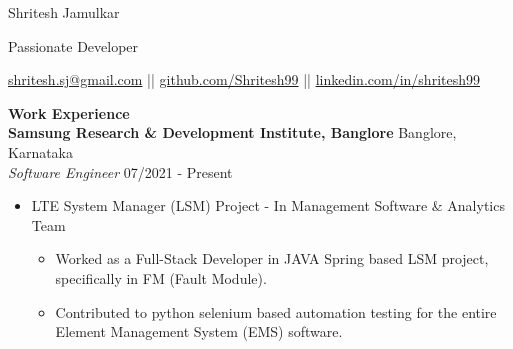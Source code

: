 \documentclass{article}
\begin{document}
\begin{center}

\LARGE Shritesh Jamulkar \\

\vspace{3pt}

\large \textcolor{NavyBlue}{Passionate Developer} \\

\vspace{5pt}

\normalsize \href{mailto:shritesh.sj@gmail@gmail.com}{shritesh.sj@gmail.com} || \href{https://github.com/Shritesh99}{github.com/Shritesh99} || \href{https://linkedin.com/in/shritesh99}{linkedin.com/in/shritesh99} \\
\end{center}

\noindent \large \textbf{\textcolor{NavyBlue}{Work Experience}} \vspace{5pt} \\
\noindent \normalsize \textbf{Samsung Research \& Development Institute, Banglore} \hfill Banglore, Karnataka \\
\textit{Software Engineer} \hfill 07/2021 - Present
\begin{itemize}[noitemsep,nolistsep,leftmargin=*]
    \item {\normalsize {LTE System Manager (LSM) Project - In Management Software \& Analytics Team }
        \begin{itemize}
            \item  Worked as a Full-Stack Developer in JAVA Spring based LSM project, specifically in FM (Fault Module).
            \item Contributed to python selenium based automation testing for the entire Element Management System (EMS) software.
        \end{itemize}
    }
\end{itemize}

\vspace{5pt}
\end{document}
